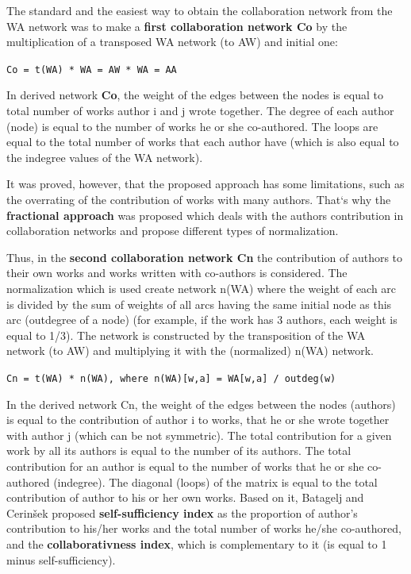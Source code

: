 \documentclass[11pt]{article} %
\begin{document}
The standard and the easiest way to obtain the collaboration network from the WA network was to make a \textbf{first collaboration network Co} \citep{OnBibl} by the multiplication of a transposed WA network (to AW) and initial one: \smallskip

\texttt{Co = t(WA) * WA = AW * WA = AA} \smallskip

In derived network  \textbf{Co}, the weight of the edges between the nodes is equal to total number of works author i and j wrote together. The degree of each author (node) is equal to the number of works he or she co-authored. The loops are equal to the total number of works that each author have (which is also equal to the indegree values of the WA network). \medskip 

It was proved, however, that the proposed approach has some limitations, such as the overrating of the contribution of works with many authors. That`s why the \textbf{fractional approach} \citep{OnBibl} was proposed which deals with the authors contribution in collaboration networks and propose different types of normalization. \medskip 

Thus, in the \textbf{second collaboration network Cn} the contribution of authors to their own works and works written with co-authors is considered. The normalization which is used create network n(WA) where the weight of each arc is divided by the sum of weights of all arcs having the same initial node as this arc (outdegree of a node) (for example, if the work has 3 authors, each weight is equal to 1/3). The network is constructed by the transposition of the WA network (to AW) and multiplying it with the (normalized) n(WA) network.\smallskip

\texttt{Cn = t(WA) * n(WA), where n(WA)[w,a] = WA[w,a] / outdeg(w)} \smallskip
 
In the derived network Cn, the weight of the edges between the nodes (authors) is equal to the contribution of author i to works, that he or she wrote together with author j (which can be not symmetric). The total contribution for a given work by all its authors is equal to the number of its authors. The total contribution for an author is equal to the number of works that he or she co-authored (indegree). The diagonal (loops) of the matrix is equal to the total contribution of author to his or her own works. Based on it, Batagelj and Cerinšek \citep{OnBibl} proposed \textbf{self-sufficiency index} as the proportion of author's contribution to his/her works and the total number of works he/she co-authored, and the \textbf{collaborativness index}, which is complementary to it (is equal to 1 minus self-sufficiency). \medskip 
\end{document}
